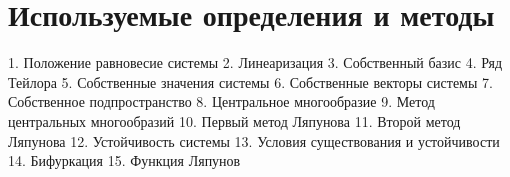 \chapter{Используемые определения и методы}
1. Положение равновесие системы
2. Линеаризация
3. Собственный базис
4. Ряд Тейлора
5. Собственные значения системы
6. Собственные векторы системы
7. Собственное подпространство
8. Центральное многообразие
9. Метод центральных многообразий
10. Первый метод Ляпунова
11. Второй метод Ляпунова
12. Устойчивость системы
13. Условия существования и устойчивости
14. Бифуркация 
15. Функция Ляпунов

